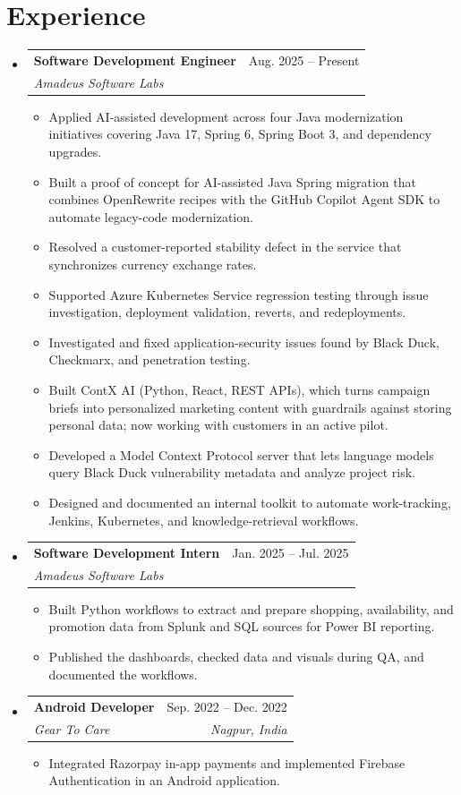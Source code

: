 \documentclass[a4paper,11pt]{article}
\makeatletter
\newcommand{\entry}[4]{\item\begin{tabularx}{\textwidth}{@{}Xr@{}}\textbf{#1}& #2\\\textit{\small #3}&\textit{\small #4}\end{tabularx}\vspace{-5pt}}
\newcommand{\bulletpoint}[1]{\item\small{#1}}
\makeatother
\begin{document}
\section{Experience}
\begin{itemize}[leftmargin=0in,label={}]
  \entry{Software Development Engineer}{Aug. 2025 -- Present}{Amadeus Software Labs}{}
  \begin{itemize}
    \bulletpoint{Applied AI-assisted development across four Java modernization initiatives covering Java 17, Spring 6, Spring Boot 3, and dependency upgrades.}
    \bulletpoint{Built a proof of concept for AI-assisted Java Spring migration that combines OpenRewrite recipes with the GitHub Copilot Agent SDK to automate legacy-code modernization.}
    \bulletpoint{Resolved a customer-reported stability defect in the service that synchronizes currency exchange rates.}
    \bulletpoint{Supported Azure Kubernetes Service regression testing through issue investigation, deployment validation, reverts, and redeployments.}
    \bulletpoint{Investigated and f{}ixed application-security issues found by Black Duck, Checkmarx, and penetration testing.}
    \bulletpoint{Built ContX AI (Python, React, REST APIs), which turns campaign briefs into personalized marketing content with guardrails against storing personal data; now working with customers in an active pilot.}
    \bulletpoint{Developed a Model Context Protocol server that lets language models query Black Duck vulnerability metadata and analyze project risk.}
    \bulletpoint{Designed and documented an internal toolkit to automate work-tracking, Jenkins, Kubernetes, and knowledge-retrieval workf{}lows.}
  \end{itemize}
  \entry{Software Development Intern}{Jan. 2025 -- Jul. 2025}{Amadeus Software Labs}{}
  \begin{itemize}
    \bulletpoint{Built Python workf{}lows to extract and prepare shopping, availability, and promotion data from Splunk and SQL sources for Power BI reporting.}
    \bulletpoint{Published the dashboards, checked data and visuals during QA, and documented the workf{}lows.}
  \end{itemize}
  \entry{Android Developer}{Sep. 2022 -- Dec. 2022}{Gear To Care}{Nagpur, India}
  \begin{itemize}
    \bulletpoint{Integrated Razorpay in-app payments and implemented Firebase Authentication in an Android application.}
  \end{itemize}
\end{itemize}
\end{document}
